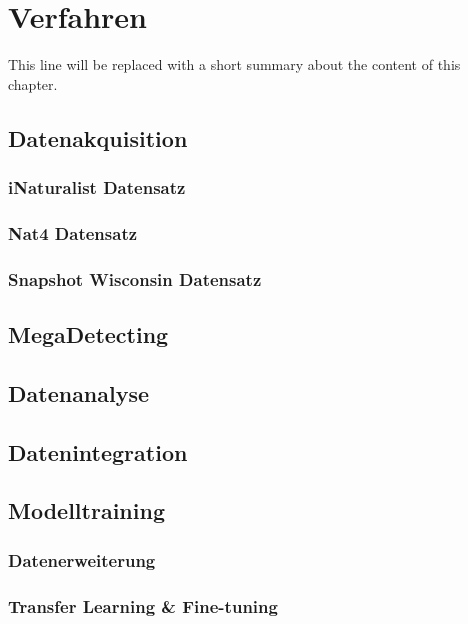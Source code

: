 \chapter{Verfahren} \label{chap:training}

This line will be replaced with a short summary about the content of this chapter.


\section{Datenakquisition}

\subsection{iNaturalist Datensatz}

\subsection{Nat4 Datensatz}

\subsection{Snapshot Wisconsin Datensatz}

\section{MegaDetecting}

\section{Datenanalyse}

\section{Datenintegration}

\section{Modelltraining}

\subsection{Datenerweiterung}

\subsection{Transfer Learning \& Fine-tuning}